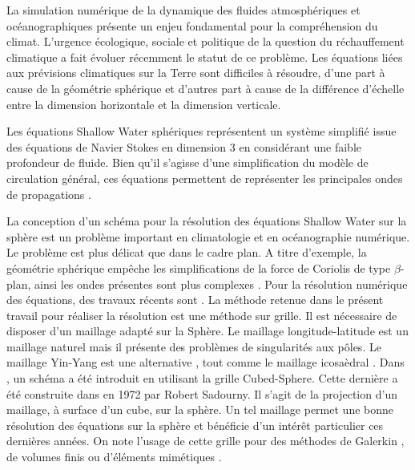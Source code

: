 La simulation numérique de la dynamique des fluides atmosphériques et océanographiques présente un enjeu fondamental pour la compréhension du climat. L'urgence écologique, sociale et politique de la question du réchauffement climatique a fait évoluer récemment le statut de ce problème. Les équations liées aux prévisions climatiques sur la Terre sont difficiles à résoudre, d'une part à cause de la géométrie sphérique et d'autres part à cause de la différence d'échelle entre la dimension horizontale et la dimension verticale. 

Les équations Shallow Water sphériques représentent un système simplifié issue des équations de Navier Stokes en dimension 3 en considérant une faible profondeur de fluide. Bien qu'il s'agisse d'une simplification du modèle de circulation général, ces équations permettent de représenter les principales ondes de propagations \cite{Paldor2015, Vallis2017}.

La conception d'un schéma pour la résolution des équations Shallow Water sur la sphère est un problème important en climatologie et en océanographie numérique. Le problème est plus délicat que dans le cadre plan. A titre d'exemple, la géométrie sphérique empêche les simplifications de la force de Coriolis de type $\beta$-plan, ainsi les ondes présentes sont plus complexes \cite{Paldor2015}. Pour la résolution numérique des équations, des travaux récents sont \cite{Nair2010, Qaddouri2012, Ullrich2011}. La méthode retenue dans le présent travail pour réaliser la résolution est une méthode sur grille. Il est nécessaire de disposer d'un maillage adapté sur la Sphère. Le maillage longitude-latitude est un maillage naturel mais il présente des problèmes de singularités aux pôles. Le maillage Yin-Yang est une alternative \cite{Kageyama2004, Li2008}, tout comme le maillage icosaèdral \cite{Stuhne1999}. 
Dans \cite{Croisille2015, Croisille2013}, un schéma a été introduit en utilisant la grille Cubed-Sphere. Cette dernière a été construite dans \cite{Sadourny1972} en 1972 par Robert Sadourny. Il s'agit de la projection d'un maillage, à surface d'un cube, sur la sphère. Un tel maillage permet une bonne résolution des équations sur la sphère \cite{Ronchi1996} et bénéficie d'un intérêt particulier ces dernières années. On note l'usage de cette grille pour des méthodes de Galerkin \cite{Nair2010}, de volumes finis \cite{Chen2008,Ullrich2011} ou d'éléments mimétiques \cite{Lauritzen2010}.

